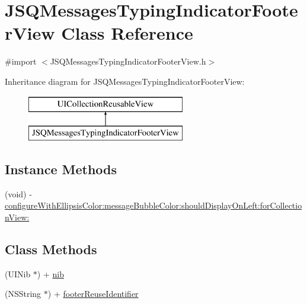 \hypertarget{interface_j_s_q_messages_typing_indicator_footer_view}{}\section{J\+S\+Q\+Messages\+Typing\+Indicator\+Footer\+View Class Reference}
\label{interface_j_s_q_messages_typing_indicator_footer_view}


{\ttfamily \#import $<$J\+S\+Q\+Messages\+Typing\+Indicator\+Footer\+View.\+h$>$}

Inheritance diagram for J\+S\+Q\+Messages\+Typing\+Indicator\+Footer\+View\+:\begin{figure}[H]
\begin{center}
\leavevmode
\includegraphics[height=2.000000cm]{interface_j_s_q_messages_typing_indicator_footer_view}
\end{center}
\end{figure}
\subsection*{Instance Methods}
\begin{DoxyCompactItemize}
\item 
(void) -\/ \hyperlink{interface_j_s_q_messages_typing_indicator_footer_view_a8901993f187be90ce22fcde392319264}{configure\+With\+Ellipsis\+Color\+:message\+Bubble\+Color\+:should\+Display\+On\+Left\+:for\+Collection\+View\+:}
\end{DoxyCompactItemize}
\subsection*{Class Methods}
\begin{DoxyCompactItemize}
\item 
(U\+I\+Nib $\ast$) + \hyperlink{interface_j_s_q_messages_typing_indicator_footer_view_ad945b6c6838aafd3379a1f5cde012bb2}{nib}
\item 
(N\+S\+String $\ast$) + \hyperlink{interface_j_s_q_messages_typing_indicator_footer_view_accd9c376ec6c8312e48034203865a7e1}{footer\+Reuse\+Identifier}
\end{DoxyCompactItemize}


